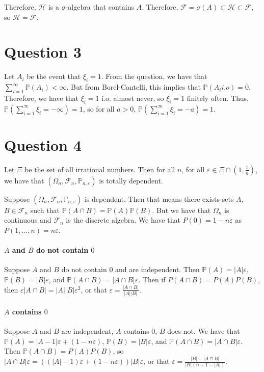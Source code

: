 \documentclass{article}
\theoremstyle{definition}
\numberwithin{theorem}{section}
\numberwithin{equation}{section}
\begin{document}
Therefore, $\mathcal{H}$ is a $\sigma$-algebra that contains $A$. Therefore, $\mathcal{F} = \sigma(A) \subset \mathcal{H} \subset \mathcal{F}$, so $\mathcal{H} = \mathcal{F}$.  
\section{Question 3}
Let $A_i$ be the event that $\xi_i= 1$. From the question, we have that $\sum_{i = 1}^{\infty}\mathbb{P}(A_i) < \infty$. But from Borel-Cantelli, this implies that $\mathbb{P}(A_i i.o) = 0$. Therefore, we have that $\xi_i = 1$ i.o. almost never, so $\xi_i = 1$ finitely often. Thus, $\mathbb{P}\left(\sum_{i = 1}^{\infty} \xi_i = - \infty \right) = 1$, so for all $a > 0$, $\mathbb{P}\left(\sum_{i = 1}^{\infty} \xi_i = - a \right) = 1$. 

\section{Question 4}
Let $\Xi$ be the set of all irrational numbers. Then for all $n$, for all $\varepsilon \in \Xi \cap (1, \frac{1}{n})$, we have that $(\Omega_n, \mathcal{F}_n, \mathbb{P}_{n, \varepsilon})$ is totally dependent. 

\par
Suppose $(\Omega_n, \mathcal{F}_n, \mathbb{P}_{n, \varepsilon})$ is dependent. Then that means there exists sets $A$, $B \in \mathcal{F}_n$ such that $\mathbb{P}(A \cap B) = \mathbb{P}(A) \mathbb{P}(B)$. But we have that $\Omega_n$ is continuous and $\mathcal{F}_n$ is the discrete algebra. We have that $P(0) = 1 - n\varepsilon$ as $P({1, ..., n}) = n \varepsilon$. 

\paragraph{$A$ and $B$ do not contain $0$}
Suppose $A$ and $B$ do not contain $0$ and are independent. Then $\mathbb{P}(A) = |A| \varepsilon$, $\mathbb{P}(B) = |B| \varepsilon$, and $\mathbb{P}(A \cap B) = |A \cap B| \varepsilon$. Then if $P(A \cap B) = P(A) P(B)$, then $\varepsilon |A \cap B| = |A| |B| \varepsilon^2$, or that $\varepsilon = \frac{|A \cap B|}{|A| |B|}$. 

\paragraph{$A$ contains $0$}
Suppose $A$ and $B$ are independent, $A$ contains $0$, $B$ does not. 
We have that $\mathbb{P}(A) = |A - 1| \varepsilon + (1 - n \varepsilon)$, $\mathbb{P}(B) = |B| \varepsilon$, and $\mathbb{P}(A \cap B) = |A \cap B| \varepsilon$. Then $\mathbb{P}(A \cap B) = P(A) P(B)$, so $ |A \cap B| \varepsilon = ((|A| - 1) \varepsilon + (1 - n \varepsilon))|B| \varepsilon$, or that $\varepsilon = \frac{|B| - |A \cap B|}{|B|(n + 1 - |A|)}$. 
\end{document}
